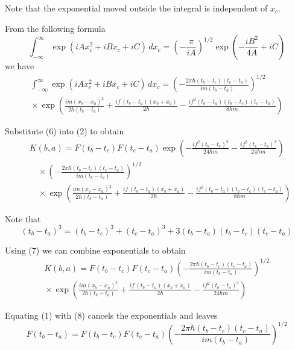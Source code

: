 \documentclass[12pt]{article}
\begin{document}
\bigskip
Note that the exponential moved outside the integral is independent of $x_c$.

\bigskip
From the following formula
\begin{equation*}
\int_{-\infty}^{\infty}\exp(iAx_c^2+iBx_c+iC)\,dx_c
=\left(-\frac{\pi}{iA}\right)^{1/2}
\exp\left(-\frac{iB^2}{4A}+iC\right)
\end{equation*}
we have
{\footnotesize
\begin{multline*}
\int_{-\infty}^{\infty}\exp(iAx_c^2+iBx_c+iC)\,dx_c
=\left(-\frac{2\pi\hbar(t_b-t_c)(t_c-t_a)}{im(t_b-t_a)}\right)^{1/2}
\\
{}\times\exp\left(
\frac{im(x_b-x_a)^2}{2\hbar(t_b-t_a)}
+\frac{if\,(t_b-t_a)(x_b+x_a)}{2\hbar}
-\frac{if^2(t_b-t_a)(t_b-t_c)(t_c-t_a)}{8\hbar m}
\right)
\tag{6}
\end{multline*}
}

\bigskip
Substitute (6) into (2) to obtain
{\footnotesize
\begin{align*}
&K(b,a)=F(t_b-t_c)F(t_c-t_a)
\exp\left(-\frac{if^2(t_b-t_c)^3}{24\hbar m}-\frac{if^2(t_c-t_a)^3}{24\hbar m}\right)
\\
&\quad{}\times
\left(-\frac{2\pi\hbar(t_b-t_c)(t_c-t_a)}{im(t_b-t_a)}\right)^{1/2}
\\
&\quad{}\times
\exp\left(
\frac{im(x_b-x_a)^2}{2\hbar(t_b-t_a)}
+\frac{if\,(t_b-t_a)(x_b+x_a)}{2\hbar}
-\frac{if^2(t_b-t_a)(t_b-t_c)(t_c-t_a)}{8\hbar m}
\right)
\end{align*}
}

Note that
\begin{equation*}
(t_b-t_a)^3=(t_b-t_c)^3+(t_c-t_a)^3+3(t_b-t_a)(t_b-t_c)(t_c-t_a)
\tag{7}
\end{equation*}

Using (7) we can combine exponentials to obtain
\begin{multline*}
K(b,a)=F(t_b-t_c)F(t_c-t_a)
\left(-\frac{2\pi\hbar(t_b-t_c)(t_c-t_a)}{im(t_b-t_a)}\right)^{1/2}
\\
{}\times
\exp\left(
\frac{im(x_b-x_a)^2}{2\hbar(t_b-t_a)}
+\frac{if\,(t_b-t_a)(x_b+x_a)}{2\hbar}
-\frac{if^2(t_b-t_a)^3}{24\hbar m}
\right)
\tag{8}
\end{multline*}

Equating (1) with (8) cancels the exponentials and leaves
\begin{equation*}
F(t_b-t_a)=F(t_b-t_c)F(t_c-t_a)
\left(-\frac{2\pi\hbar(t_b-t_c)(t_c-t_a)}{im(t_b-t_a)}\right)^{1/2}
\tag{9}
\end{equation*}
\end{document}
